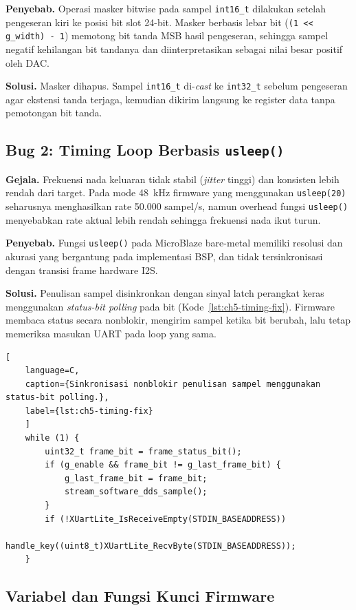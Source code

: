 \textbf{Penyebab.} Operasi masker bitwise pada sampel \texttt{int16\_t} dilakukan setelah pengeseran kiri ke posisi bit slot 24-bit. Masker berbasis lebar bit (\texttt{(1 << g\_width) - 1}) memotong bit tanda MSB hasil pengeseran, sehingga sampel negatif kehilangan bit tandanya dan diinterpretasikan sebagai nilai besar positif oleh DAC.

\textbf{Solusi.} Masker dihapus. Sampel \texttt{int16\_t} di-\textit{cast} ke \texttt{int32\_t} sebelum pengeseran agar ekstensi tanda terjaga, kemudian dikirim langsung ke register data tanpa pemotongan bit tanda.

\subsection{Bug 2: Timing Loop Berbasis \texttt{usleep()}}

\textbf{Gejala.} Frekuensi nada keluaran tidak stabil (\textit{jitter} tinggi) dan konsisten lebih rendah dari target. Pada mode 48~kHz firmware yang menggunakan \texttt{usleep(20)} seharusnya menghasilkan rate 50.000 sampel/s, namun overhead fungsi \texttt{usleep()} menyebabkan rate aktual lebih rendah sehingga frekuensi nada ikut turun.

\textbf{Penyebab.} Fungsi \texttt{usleep()} pada MicroBlaze bare-metal memiliki resolusi dan akurasi yang bergantung pada implementasi BSP, dan tidak tersinkronisasi dengan transisi frame hardware I2S.

\textbf{Solusi.} Penulisan sampel disinkronkan dengan sinyal latch perangkat keras menggunakan \textit{status-bit polling} pada bit  (Kode~\ref{lst:ch5-timing-fix}). Firmware membaca status secara nonblokir, mengirim sampel ketika bit berubah, lalu tetap memeriksa masukan UART pada loop yang sama.

\begin{lstlisting}[
	language=C,
	caption={Sinkronisasi nonblokir penulisan sampel menggunakan status-bit polling.},
	label={lst:ch5-timing-fix}
	]
	while (1) {
		uint32_t frame_bit = frame_status_bit();
		if (g_enable && frame_bit != g_last_frame_bit) {
			g_last_frame_bit = frame_bit;
			stream_software_dds_sample();
		}
		if (!XUartLite_IsReceiveEmpty(STDIN_BASEADDRESS))
			handle_key((uint8_t)XUartLite_RecvByte(STDIN_BASEADDRESS));
	}
\end{lstlisting}

\subsection{Variabel dan Fungsi Kunci Firmware}

